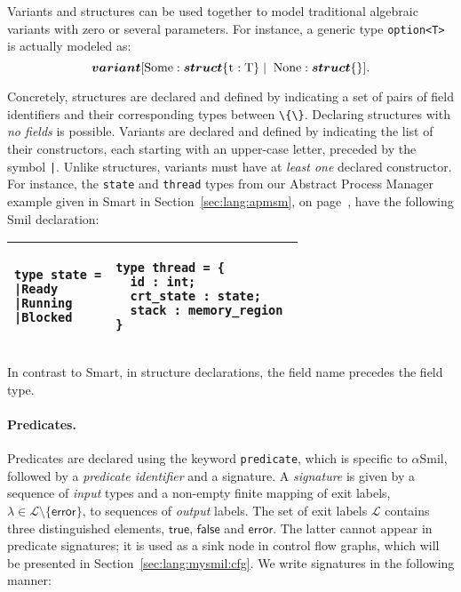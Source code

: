 \documentclass[11pt]{article}
\def\slang{\textsf{Smart}}
\def\smil{\textsf{Smil}}
\newcommand{\disp}[1]{\lstinline&#1&}
\def\lbtrue{\textsf{true}}
\def\lbfalse{\textsf{false}}
\def\lbtrue{\textsf{true}}
\def\lbfalse{\textsf{false}}
\def\asmil{\textsf{$\alpha$Smil}}
\def\optiont{\boldsymbol{\small{variant}}
[\textrm{\disp{Some}} : \boldsymbol{\small{struct}}\{\textrm{\disp{t}} : \textrm{\disp{T}}\} \; 
\arrowvert\; 
\; \textrm{\disp{None}} : \boldsymbol{\small{struct}}\{\}]}
\begin{document}
\noindent Variants and structures can be used together to model traditional 
algebraic variants with zero or several parameters. For instance, a generic 
type \disp{option<T>} is actually modeled as:
%
\[ \optiont. \] 
 
Concretely, structures are declared and defined by indicating a set of pairs of 
field identifiers and their corresponding types between \disp{\{\}}. Declaring
structures with \emph{no fields} is possible. Variants are declared and defined 
by indicating the list of their constructors, each starting with an upper-case 
letter, preceded by the symbol \disp{|}. Unlike structures, variants must have at 
\emph{least one} declared constructor. For instance, the \disp{state} and 
\disp{thread} types from our Abstract Process Manager example given in {\slang} 
in Section~\ref{sec:lang:apmsm}, on page~\pageref{ch3:threadtype}, 
have the following {\smil} declaration:

\begin{longtable}{ll}
\toprule
\begin{lstlisting}
type state =
|Ready
|Running
|Blocked
\end{lstlisting} 
&\phantom{aaaa}\begin{lstlisting} 
type thread = {
  id : int;
  crt_state : state;
  stack : memory_region 
}
\end{lstlisting}\\
\bottomrule 
\end{longtable}

\noindent In contrast to {\slang}, in structure declarations, the field name precedes 
the field type.


\paragraph{Predicates.} Predicates are declared using the keyword 
\disp{predicate}, which is specific to {\asmil}, followed by a \emph{predicate 
identifier} and a signature. A \emph{signature} is given by a sequence of 
\emph{input} types and a non-empty finite mapping of exit labels, 
$\lambda \in \mathcal{L}\setminus \{\textsf{error}\}$, to sequences of 
\emph{output} labels. The set of exit labels 
$\mathcal{L}$ contains three 
distinguished elements, 
$\lbtrue$, $\lbfalse$ and $\textsf{error}$. The latter
cannot appear in predicate signatures; it is used as a sink node in control
flow graphs, which will be presented in Section~\ref{sec:lang:mysmil:cfg}. 
We write signatures in the following manner:
\end{document}
